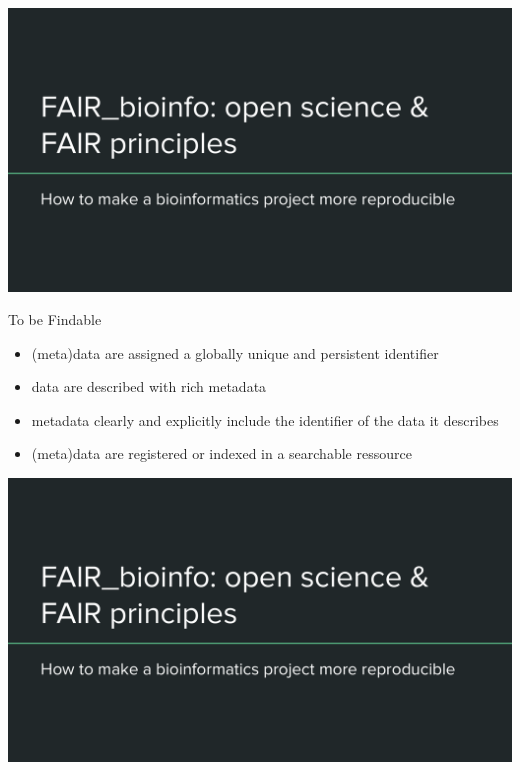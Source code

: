 \begin{frame}
\includegraphics[page=8,scale=0.55]{images/01_OS_and_FAIR_intro.pdf}
\end{frame}

\begin{frame}
\begin{block}{To be Findable}
\begin{itemize}
\item (meta)data are assigned a globally unique and persistent identifier
\item data are described with rich metadata
\item metadata clearly and explicitly include the identifier of the data it describes
\item (meta)data are registered or indexed in a searchable ressource
\end{itemize}
\end{block}
\end{frame}

\begin{frame}
\includegraphics[page=9,scale=0.55]{images/01_OS_and_FAIR_intro.pdf}
\end{frame}

